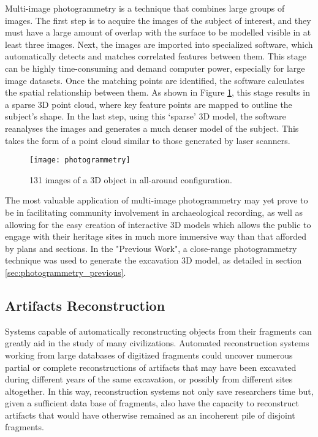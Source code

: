 Multi-image photogrammetry is a technique that combines large groups of images.
The first step is to acquire the images of the subject of interest, and they must have a large amount of overlap with
the surface to be modelled visible in at least three images.
Next, the images are imported into specialized software, which automatically detects and matches correlated features between them. This stage can be highly time-consuming 
and demand computer power, especially for large image datasets. Once the matching points are identified, the software
calculates the spatial relationship between them. As shown in Figure \ref{fig:photo2}, this stage results in a sparse \gls{3D} point cloud, where key feature points are mapped to outline the subject’s shape. In the last step, using this ‘sparse’ \gls{3D} model, the software
reanalyses the images and generates a much denser model of the
subject. This takes the form of a point cloud similar to those
generated by laser scanners.~\cite{mccarthy2014multi}


\begin{figure}[h!]
    \centering
    \texttt{[image: photogrammetry]}
    \caption{131 images of a \gls{3D} object in all-around configuration.~\cite{luhmann2016sensor}}
    \label{fig:photo2}
\end{figure} 
\FloatBarrier

 
  
The most valuable application of multi-image photogrammetry
may yet prove to be in facilitating community involvement in
archaeological recording, as well as allowing for the easy creation of
interactive \gls{3D} models which allows the public to
engage with their heritage sites in much more immersive way than
that afforded by plans and sections. In the "Previous Work", a close-range photogrammetry technique was used to generate the excavation \gls{3D} model, as detailed in section \ref{sec:photogrammetry_previous}.



\subsection{Artifacts Reconstruction}
\label{sec:reconstruction}

Systems capable of automatically reconstructing objects from their fragments can greatly aid in the study of many civilizations.
Automated reconstruction systems working from large databases of digitized fragments could uncover numerous partial or
complete reconstructions of artifacts that may have been excavated during different years of the same excavation, or possibly
from different sites altogether. In this way, reconstruction systems not only save researchers time but, given a sufficient data
base of fragments, also have the capacity to reconstruct artifacts that would have otherwise remained as an incoherent pile of disjoint fragments.
~\cite{willis2008computational}

